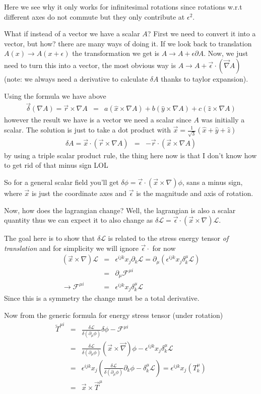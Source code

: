 \documentclass[aps,preprint,preprintnumbers,nofootinbib,showpacs,prd]{revtex4-1}
\newcommand{\nbea}{\begin{eqnarray*}}
\newcommand{\neea}{\end{eqnarray*}}
\begin{document}
Here we see why it only works for infinitesimal rotations since rotations w.r.t different axes do not commute but they only contribute at $\epsilon^2$.

What if instead of a vector we have a scalar $A$? First we need to convert it into a vector, but how? there are many ways of doing it. If we look back to translation $A(x) \rightarrow A(x + \epsilon)$ the transformation we get is $A \rightarrow A + \epsilon \partial A$. Now, we just need to turn this into a vector, the most obvious way is $A \rightarrow A + \vec\epsilon \cdot  (\vec \nabla A)$ (note: we always need a derivative to calculate $\delta A$ thanks to taylor expansion).

Using the formula we have above 
\nbea
\vec \delta (\nabla A) = \vec r \times \nabla A & = & a (\hat x \times \nabla A) + b (\hat y \times \nabla A) + c (\hat z \times \nabla A)
\neea
however the result we have is a vector we need a scalar since $A$ was initially a scalar. The solution is just to take a dot product with $\vec x = \frac{1}{\sqrt{3}}(\hat x + \hat y + \hat z)$
\nbea
\delta A = \vec x \cdot (\vec r \times \nabla A) & = & - \vec r \cdot (\vec x \times \nabla A)
\neea
by using a triple scalar product rule, the thing here now is that I don't know how to get rid of that minus sign LOL

So for a general scalar field you'll get $\delta \phi = \vec \epsilon \cdot (\vec x \times \nabla) \phi$, sans a minus sign, where $\vec x$ is just the coordinate axes and $\vec \epsilon$ is the magnitude and axis of rotation.

Now, how does the lagrangian change? Well, the lagrangian is also a scalar quantity thus we can expect it to also change as $\delta \mathcal{L} =  \vec \epsilon \cdot (\vec x \times \nabla) \mathcal{L}$.

The goal here is to show that $\delta \mathcal{L}$ is related to the stress energy tensor {\it of translation} and for simplicity we will ignore $\vec \epsilon \cdot$ for now
\nbea
(\vec x \times \nabla) \mathcal{L} & = & \epsilon^{ijk} x_j \partial_k \mathcal{L} = \partial_\mu (\epsilon^{ijk} x_j \delta^\mu_k \mathcal{L}) \\
& = & \partial_\mu \mathcal{F}^{\mu i} \\
\rightarrow \mathcal{F}^{\mu i} & = & \epsilon^{ijk} x_j \delta^\mu_k \mathcal{L}
\neea
Since this is a symmetry the change must be a total derivative.

Now from the generic formula for energy stress tensor (under rotation)
\nbea
\widetilde T^{\mu i} & = & \frac{\delta \mathcal{L}}{\delta(\partial_\mu \phi)} \delta \phi - \mathcal{F}^{\mu i} \\
& = & \frac{\delta \mathcal{L}}{\delta(\partial_\mu \phi)} (\vec x \times \vec \nabla) \phi - \epsilon^{ijk} x_j \delta^\mu_k \mathcal{L} \\
& = & \epsilon^{ijk} x_j \left (  \frac{\delta \mathcal{L}}{\delta(\partial_\mu \phi)} \partial_k \phi - \delta^\mu_k \mathcal{L} \right ) =  \epsilon^{ijk} x_j (T^\mu_k) \\
& = & \vec x \times \vec T^\mu
\neea
\end{document}
